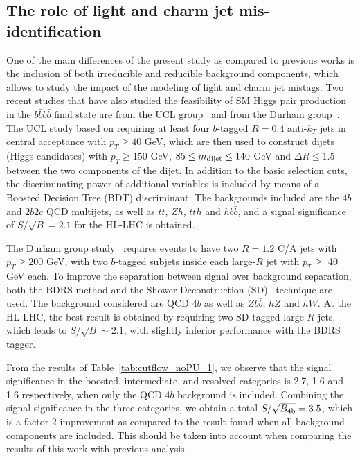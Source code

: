 \subsection{The role of light  and charm jet mis-identification}

One of the main differences of the present study as compared
to previous works is the inclusion of both irreducible
and reducible background components, which allows
to study the impact of the modeling of light and charm jet mistags. 
%
Two recent studies that have also studied the
feasibility of SM Higgs pair production in the $b\bar{b}b\bar{b}$
final state are from the UCL group~\cite{Wardrope:2014kya} and from
the
Durham group~\cite{deLima:2014dta}.
%
The UCL study based
on requiring at least four $b$-tagged $R=0.4$ anti-$k_T$ jets
in central acceptance with $p_T \ge 40$ GeV, which are
then used to construct dijets (Higgs candidates) with
$p_T \ge 150$ GeV, $85 \le m_{\rm dijet} \le 140$ GeV
and $\Delta R \le 1.5$ between the two components
of the dijet.
%
In addition to the basic selection cuts, the discriminating
power of
additional variables is included by means of a 
Boosted Decision Tree (BDT) discriminant.
%
The backgrounds included are the $4b$ and
$2b2c$ QCD multijets, as well as
$t\bar{t}$, $Zh$, $t\bar{t}h$ and $hb\bar{b}$,
and a signal significance of $S/\sqrt{B}=2.1$ for the HL-LHC
is obtained.

The Durham group study~\cite{deLima:2014dta} requires events
to have two $R=1.2$ C/A jets with $p_T\ge 200$ GeV, with
two $b$-tagged subjets inside each large-$R$ jet with
$p_T \ge$ 40 GeV each.
%
To improve the separation between
signal over background separation, both the BDRS
method and the Shower Deconstruction (SD)~\cite{Soper:2011cr,Soper:2012pb}
technique are used.
%
The background considered are QCD $4b$ as well as $Zb\bar{b}$, $hZ$ and
$hW$.
%
At the HL-LHC, the best result is obtained by requiring two
SD-tagged large-$R$ jets, which leads to $S/\sqrt{B}\sim 2.1$, with
 slightly inferior performance with the BDRS tagger.
 

%
 From the results of Table~\ref{tab:cutflow_noPU_1}, we observe
 that the signal significance in the boosted, intermediate,
 and resolved categories is 2.7, 1.6 and 1.6 respectively,
 when only the QCD $4b$ background is included.
 Combining the signal significance in the three categories,
 we
 obtain  a total $S/\sqrt{B_{\rm 4b}}=3.5$, which is a factor
 2 improvement as compared to the result found when
 all background components are included.
 This should be taken into account when comparing
 the results of this work with previous analysis.

